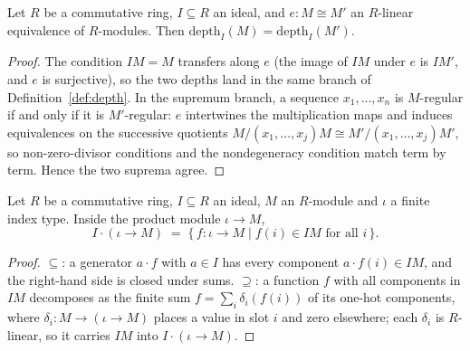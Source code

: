 \begin{lemma}
  \label{lem:depth_linearEquiv}
  \leanok
  Let \(R\) be a commutative ring, \(I \subseteq R\) an ideal, and \(e : M \cong M'\) an
  \(R\)-linear equivalence of \(R\)-modules. Then
  \(\mathrm{depth}_I(M) = \mathrm{depth}_I(M')\).
\end{lemma}
\begin{proof}
  \leanok
  The condition \(IM = M\) transfers along \(e\) (the image of \(IM\) under \(e\) is
  \(IM'\), and \(e\) is surjective), so the two depths land in the same branch of
  Definition~\ref{def:depth}. In the supremum branch, a sequence \(x_1, \dots, x_n\) is
  \(M\)-regular if and only if it is \(M'\)-regular: \(e\) intertwines the
  multiplication maps and induces equivalences on the successive quotients
  \(M/(x_1, \dots, x_j)M \cong M'/(x_1, \dots, x_j)M'\), so non-zero-divisor conditions
  and the nondegeneracy condition match term by term. Hence the two suprema agree.
\end{proof}

\begin{lemma}
  \label{lem:ideal_smul_top_pi}
  \leanok
  Let \(R\) be a commutative ring, \(I \subseteq R\) an ideal, \(M\) an \(R\)-module and
  \(\iota\) a finite index type. Inside the product module \(\iota \to M\),
  \[
    I \cdot (\iota \to M) \;=\; \{\, f : \iota \to M \mid f(i) \in IM
      \text{ for all } i \,\}.
  \]
\end{lemma}
\begin{proof}
  \leanok
  \(\subseteq\): a generator \(a \cdot f\) with \(a \in I\) has every component
  \(a \cdot f(i) \in IM\), and the right-hand side is closed under sums.
  \(\supseteq\): a function \(f\) with all components in \(IM\) decomposes as the finite
  sum \(f = \sum_i \delta_i(f(i))\) of its one-hot components, where
  \(\delta_i : M \to (\iota \to M)\) places a value in slot \(i\) and zero elsewhere;
  each \(\delta_i\) is \(R\)-linear, so it carries \(IM\) into
  \(I \cdot (\iota \to M)\).
\end{proof}


